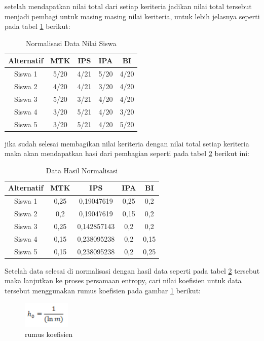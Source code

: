 setelah mendapatkan nilai total dari setiap keriteria jadikan nilai total tersebut menjadi pembagi untuk masing masing nilai keriteria, untuk lebih jelasnya seperti pada tabel \ref{ts4} berikut:


\begin{table}[h]
\caption{Normalisasi Data Nilai Siswa}
\centering
\begin{tabular}{|c|c|c|c|c|}
\hline
Alternatif & MTK & IPS & IPA&BI\\
\hline
Siswa 1 &5/20 & 4/21 & 5/20 &  4/20\\
\hline
Siswa 2 &4/20 & 4/21 & 3/20 &  4/20\\
\hline
Siswa 3 &5/20 & 3/21 & 4/20 &  4/20\\
\hline
Siswa 4 &3/20 & 5/21 & 4/20 &  3/20\\
\hline
Siswa 5 &3/20 & 5/21 & 4/20 &  5/20\\
\hline
\end{tabular}
\label{ts4}
\end{table}
\pagebreak
jika sudah selesai membagikan nilai keriteria dengan nilai total setiap keriteria maka akan mendapatkan hasi dari pembagian seperti pada tabel \ref{ts5} berikut ini:


\begin{table}[h]
\caption{Data Hasil Normalisasi}
\centering
\begin{tabular}{|c|c|c|c|c|}
\hline
Alternatif & MTK & IPS & IPA&BI\\
\hline
Siswa 1 &0,25 & 0,19047619 & 0,25 &  0,2\\
\hline
Siswa 2 &0,2 & 0,19047619 & 0,15 &  0,2\\
\hline
Siswa 3 &0,25 & 0,142857143 & 0,2 &  0,2\\
\hline
Siswa 4 &0,15 & 0,238095238 & 0,2 &  0,15\\
\hline
Siswa 5 &0,15 & 0,238095238 & 0,2 &  0,25\\
\hline
\end{tabular}
\label{ts5}
\end{table}

Setelah data selesai di normalisasi dengan hasil data seperti pada tabel \ref{ts5} tersebut maka lanjutkan ke proses persamaan entropy, cari nilai koefisien untuk data tersebut menggunakan rumus koefisien pada gambar \ref{rmmm1} berikut:

\begin{figure}[h]
	\centerline{\includegraphics[width=0.2\textwidth]{figures/rumus/5.png}}
	\caption{rumus koefisien}
	\label{rmmm1}
\end{figure}

